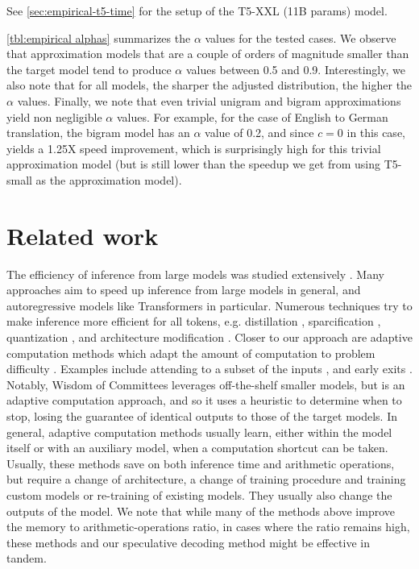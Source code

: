 See \ref{sec:empirical-t5-time} for the setup of the T5-XXL (11B params) model.

\ref{tbl:empirical alphas} summarizes the $\alpha$ values for the tested cases. We observe that approximation models that are a couple of orders of magnitude smaller than the target model tend to produce $\alpha$ values between 0.5 and 0.9. Interestingly, we also note that for all models, the sharper the adjusted distribution, the higher the $\alpha$ values. Finally, we note that even trivial unigram and bigram approximations yield non negligible $\alpha$ values. For example, for the case of English to German translation, the bigram model has an $\alpha$ value of 0.2, and since $c=0$ in this case, yields a 1.25X speed improvement, which is surprisingly high for this trivial approximation model (but is still lower than the speedup we get from using T5-small as the approximation model).


\section{Related work} The efficiency of inference from large models was studied extensively \citep{The_Efficiency_Misnomer}. Many approaches aim to speed up inference from large models in general, and autoregressive models like Transformers in particular. Numerous techniques try to make inference more efficient for all tokens, e.g. distillation \citep{Distilling_the_Knowledge_in_a_Neural_Network}, sparcification \citep{Sparse_is_Enough_in_Scaling_Transformers}, quantization \citep{Quantized_Neural_Networks}, and architecture modification \citep{Primer, multi-query-attn}. Closer to our approach are adaptive computation methods which adapt the amount of computation to problem difficulty \citep{Dynamic_Neural_Networks_Survey}. Examples include attending to a subset of the inputs \citep{Adaptive_Attention_Span_in_Transformers}, and early exits \citep{Confident_Adaptive_Transformers, early_exits, Controlling_Computation_versus_Quality_Sequence_Models, depth_adaptive_transformer, Matching_Model_and_Instance_Complexities}. Notably, Wisdom of Committees \citep{Matching_Model_and_Instance_Complexities} leverages off-the-shelf smaller models, but is an adaptive computation approach, and so it uses a heuristic to determine when to stop, losing the guarantee of identical outputs to those of the target models. In general, adaptive computation methods usually learn, either within the model itself or with an auxiliary model, when a computation shortcut can be taken. Usually, these methods save on both inference time and arithmetic operations, but require a change of architecture, a change of training procedure and training custom models or re-training of existing models. They usually also change the outputs of the model. We note that while many of the methods above improve the memory to arithmetic-operations ratio, in cases where the ratio remains high, these methods and our speculative decoding method might be effective in tandem.


